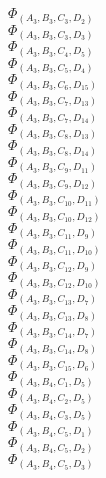 \documentclass[14pt]{article}
\begin{document}
    $\Phi_{({A}_{3}, {B}_{3}, {C}_{3}, {D}_{2})}$ \\ 
    $\Phi_{({A}_{3}, {B}_{3}, {C}_{3}, {D}_{3})}$ \\ 
    $\Phi_{({A}_{3}, {B}_{3}, {C}_{4}, {D}_{5})}$ \\ 
    $\Phi_{({A}_{3}, {B}_{3}, {C}_{5}, {D}_{4})}$ \\ 
    $\Phi_{({A}_{3}, {B}_{3}, {C}_{6}, {D}_{15})}$ \\ 
    $\Phi_{({A}_{3}, {B}_{3}, {C}_{7}, {D}_{13})}$ \\ 
    $\Phi_{({A}_{3}, {B}_{3}, {C}_{7}, {D}_{14})}$ \\ 
    $\Phi_{({A}_{3}, {B}_{3}, {C}_{8}, {D}_{13})}$ \\ 
    $\Phi_{({A}_{3}, {B}_{3}, {C}_{8}, {D}_{14})}$ \\ 
    $\Phi_{({A}_{3}, {B}_{3}, {C}_{9}, {D}_{11})}$ \\ 
    $\Phi_{({A}_{3}, {B}_{3}, {C}_{9}, {D}_{12})}$ \\ 
    $\Phi_{({A}_{3}, {B}_{3}, {C}_{10}, {D}_{11})}$ \\ 
    $\Phi_{({A}_{3}, {B}_{3}, {C}_{10}, {D}_{12})}$ \\ 
    $\Phi_{({A}_{3}, {B}_{3}, {C}_{11}, {D}_{9})}$ \\ 
    $\Phi_{({A}_{3}, {B}_{3}, {C}_{11}, {D}_{10})}$ \\ 
    $\Phi_{({A}_{3}, {B}_{3}, {C}_{12}, {D}_{9})}$ \\ 
    $\Phi_{({A}_{3}, {B}_{3}, {C}_{12}, {D}_{10})}$ \\ 
    $\Phi_{({A}_{3}, {B}_{3}, {C}_{13}, {D}_{7})}$ \\ 
    $\Phi_{({A}_{3}, {B}_{3}, {C}_{13}, {D}_{8})}$ \\ 
    $\Phi_{({A}_{3}, {B}_{3}, {C}_{14}, {D}_{7})}$ \\ 
    $\Phi_{({A}_{3}, {B}_{3}, {C}_{14}, {D}_{8})}$ \\ 
    $\Phi_{({A}_{3}, {B}_{3}, {C}_{15}, {D}_{6})}$ \\ 
    $\Phi_{({A}_{3}, {B}_{4}, {C}_{1}, {D}_{5})}$ \\ 
    $\Phi_{({A}_{3}, {B}_{4}, {C}_{2}, {D}_{5})}$ \\ 
    $\Phi_{({A}_{3}, {B}_{4}, {C}_{3}, {D}_{5})}$ \\ 
    $\Phi_{({A}_{3}, {B}_{4}, {C}_{5}, {D}_{1})}$ \\ 
    $\Phi_{({A}_{3}, {B}_{4}, {C}_{5}, {D}_{2})}$ \\ 
    $\Phi_{({A}_{3}, {B}_{4}, {C}_{5}, {D}_{3})}$ \\ 
\end{document}

